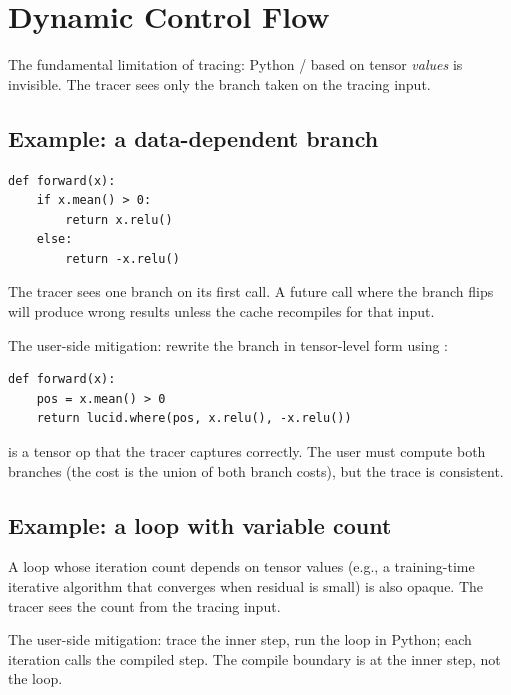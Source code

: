 \section{Dynamic Control Flow}
\label{sec:tracer:dynamic_control_flow}

The fundamental limitation of tracing: Python /
based on tensor \emph{values} is invisible. The tracer sees only
the branch taken on the tracing input.

\subsection{Example: a data-dependent branch}
\label{ssec:tracer:branch_example}

\begin{lstlisting}[style=lucid,language=LucidPython]
def forward(x):
    if x.mean() > 0:
        return x.relu()
    else:
        return -x.relu()
\end{lstlisting}

The tracer sees one branch on its first call. A future call where
the branch flips will produce wrong results unless the cache
recompiles for that input.

The user-side mitigation: rewrite the branch in tensor-level form
using :

\begin{lstlisting}[style=lucid,language=LucidPython]
def forward(x):
    pos = x.mean() > 0
    return lucid.where(pos, x.relu(), -x.relu())
\end{lstlisting}

 is a tensor op that the tracer captures correctly.
The user must compute both branches (the cost is the union of
both branch costs), but the trace is consistent.

\subsection{Example: a loop with variable count}
\label{ssec:tracer:loop_example}

A loop whose iteration count depends on tensor values (e.g., a
training-time iterative algorithm that converges when residual
is small) is also opaque. The tracer sees the count from the
tracing input.

The user-side mitigation: trace the inner step, run the loop in
Python; each iteration calls the compiled step. The compile
boundary is at the inner step, not the loop.

